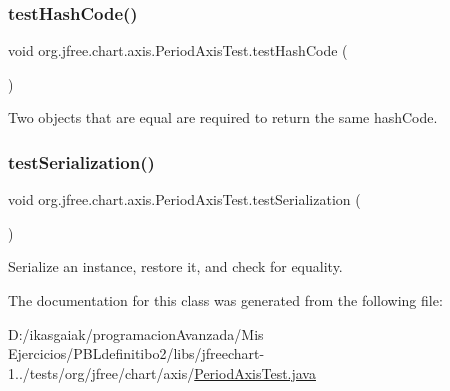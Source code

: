 \subsubsection{\texorpdfstring{test\+Hash\+Code()}{testHashCode()}}
{\footnotesize\ttfamily void org.\+jfree.\+chart.\+axis.\+Period\+Axis\+Test.\+test\+Hash\+Code (\begin{DoxyParamCaption}{ }\end{DoxyParamCaption})}

Two objects that are equal are required to return the same hash\+Code. \mbox{\label{classorg_1_1jfree_1_1chart_1_1axis_1_1_period_axis_test_a56ccc12e886ed7b1acb82e4f6ad34fc9}} 
\subsubsection{\texorpdfstring{test\+Serialization()}{testSerialization()}}
{\footnotesize\ttfamily void org.\+jfree.\+chart.\+axis.\+Period\+Axis\+Test.\+test\+Serialization (\begin{DoxyParamCaption}{ }\end{DoxyParamCaption})}

Serialize an instance, restore it, and check for equality. 

The documentation for this class was generated from the following file\+:\begin{DoxyCompactItemize}
\item 
D\+:/ikasgaiak/programacion\+Avanzada/\+Mis Ejercicios/\+P\+B\+Ldefinitibo2/libs/jfreechart-\/1../tests/org/jfree/chart/axis/\mbox{\hyperlink{_period_axis_test_8java}{Period\+Axis\+Test.\+java}}\end{DoxyCompactItemize}
